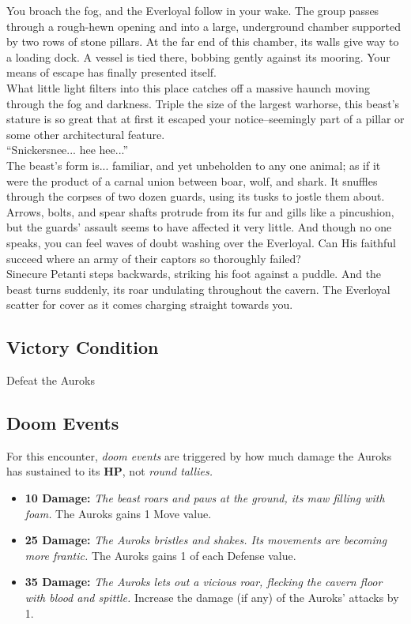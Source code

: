 You broach the fog, and the Everloyal follow in your wake. The group passes through a rough-hewn opening and into a large, underground chamber supported by two rows of stone pillars. At the far end of this chamber, its walls give way to a loading dock. A vessel is tied there, bobbing gently against its mooring. Your means of escape has finally presented itself.\\

What little light filters into this place catches off a massive haunch moving through the fog and darkness. Triple the size of the largest warhorse, this beast’s stature is so great that at first it escaped your notice--seemingly part of a pillar or some other architectural feature.\\

“Snickersnee... hee hee...”\\

The beast's form is... familiar, and yet unbeholden to any one animal; as if it were the product of a carnal union between boar, wolf, and shark. It snuffles through the corpses of two dozen guards, using its tusks to jostle them about. Arrows, bolts, and spear shafts protrude from its fur and gills like a pincushion, but the guards’ assault seems to have affected it very little. And though no one speaks, you can feel waves of doubt washing over the Everloyal. Can His faithful succeed where an army of their captors so thoroughly failed?\\

Sinecure Petanti steps backwards, striking his foot against a puddle. And the beast turns suddenly, its roar undulating throughout the cavern. The Everloyal scatter for cover as it comes charging straight towards you.

\subsection*{Victory Condition}
Defeat the Auroks

\subsection*{Doom Events}
For this encounter, \emph{doom events} are triggered by how much damage the Auroks has sustained to its \textbf{HP}, not \emph{round tallies.}
\begin{itemize}
\item \textbf{10 Damage:} \emph{The beast roars and paws at the ground, its maw filling with foam.} The Auroks gains 1 Move value.
\item \textbf{25 Damage:} \emph{The Auroks bristles and shakes. Its movements are becoming more frantic.} The Auroks gains 1 of each Defense value.
\item \textbf{35 Damage:} \emph{The Auroks lets out a vicious roar, flecking the cavern floor with blood and spittle.} Increase the damage (if any) of the Auroks’ attacks by 1.
\end{itemize}

